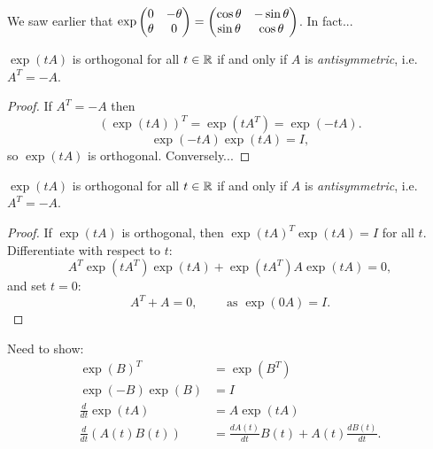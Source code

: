 \documentclass{beamer}
\begin{document}
\begin{frame}
We saw earlier that \(\exp\begin{pmatrix} 0 & -\theta \\ \theta & 0 \end{pmatrix}=\begin{pmatrix}
\cos\theta & -\sin\theta \\ \sin\theta & \cos\theta\end{pmatrix}\). In fact...


\begin{Theorem}
\(\exp(tA)\) is orthogonal for all \(t\in\mathbb{R}\) if and only if
\(A\) is {\em antisymmetric}, i.e. \(A^T=-A\).
\end{Theorem}
\begin{proof}
If \(A^T=-A\) then
\[(\exp(tA))^T=\exp(tA^T)=\exp(-tA).\]
\[\exp(-tA)\exp(tA)=I,\]
so \(\exp(tA)\) is orthogonal. Conversely...


\end{proof}
\end{frame}
\begin{frame}
\begin{Theorem}
\(\exp(tA)\) is orthogonal for all \(t\in\mathbb{R}\) if and only if
\(A\) is {\em antisymmetric}, i.e. \(A^T=-A\).
\end{Theorem}
\begin{proof}
If \(\exp(tA)\) is orthogonal, then \(\exp(tA)^T\exp(tA)=I\) for
all \(t\). Differentiate with respect to \(t\):
\[A^T\exp(tA^T)\exp(tA)+\exp(tA^T)A\exp(tA)=0,\]
and set \(t=0\):
\[A^T+A=0,\qquad\mbox{ as }\exp(0A)=I.\]


\end{proof}
\end{frame}
\begin{frame}
Need to show:
\begin{align*}
\exp(B)^T&=\exp(B^T)\\
\exp(-B)\exp(B)&=I\\
\frac{d}{dt}\exp(tA)&=A\exp(tA)\\
\frac{d}{dt}(A(t)B(t))&=\frac{dA(t)}{dt}B(t)+A(t)\frac{dB(t)}{dt}.
\end{align*}


\end{frame}
\end{document}
